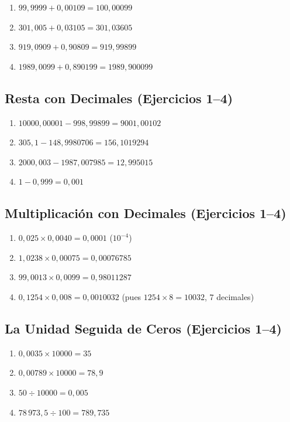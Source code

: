 \documentclass[12pt, letterpaper]{article}
\begin{document}
  \begin{enumerate}[leftmargin=*, label=\textbf{\arabic*.}]
    \item $99{,}9999 + 0{,}00109 = 100{,}00099$
    \item $301{,}005 + 0{,}03105 = 301{,}03605$
    \item $919{,}0909 + 0{,}90809 = 919{,}99899$
    \item $1989{,}0099 + 0{,}890199 = 1989{,}900099$
  \end{enumerate}

  \subsection*{Resta con Decimales (Ejercicios 1--4)}

  \begin{enumerate}[leftmargin=*, label=\textbf{\arabic*.}]
    \item $10000{,}00001 - 998{,}99899 = 9001{,}00102$
    \item $305{,}1 - 148{,}9980706 = 156{,}1019294$
    \item $2000{,}003 - 1987{,}007985 = 12{,}995015$
    \item $1 - 0{,}999 = 0{,}001$
  \end{enumerate}

  \subsection*{Multiplicación con Decimales (Ejercicios 1--4)}

  \begin{enumerate}[leftmargin=*, label=\textbf{\arabic*.}]
    \item $0{,}025 \times 0{,}0040 = 0{,}0001$ \quad ($10^{-4}$)
    \item $1{,}0238 \times 0{,}00075 = 0{,}00076785$
    \item $99{,}0013 \times 0{,}0099 = 0{,}98011287$
    \item $0{,}1254 \times 0{,}008 = 0{,}0010032$ \quad (pues $1254 \times 8 = 10032$, $7$ decimales)
  \end{enumerate}

  \subsection*{La Unidad Seguida de Ceros (Ejercicios 1--4)}

  \begin{enumerate}[leftmargin=*, label=\textbf{\arabic*.}]
    \item $0{,}0035 \times 10000 = 35$
    \item $0{,}00789 \times 10000 = 78{,}9$
    \item $50 \div 10000 = 0{,}005$
    \item $78\,973{,}5 \div 100 = 789{,}735$
  \end{enumerate}
\end{document}
